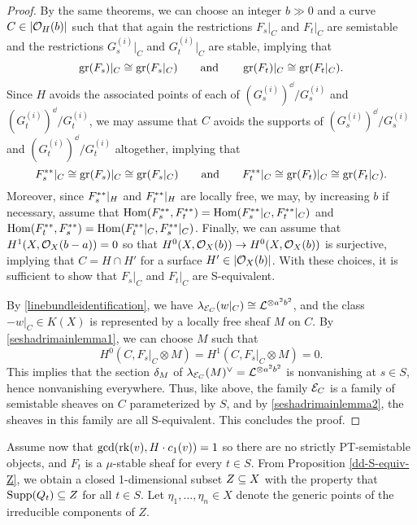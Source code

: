 \begin{proof}
By the same theorems, we can choose an integer $b \gg 0$ and a curve $C \in |\mathcal{O}_H(b)|$ such that that again the restrictions $F_s|_C$ and $F_t|_C$ are semistable and the restrictions $G_s^{(i)}|_C$ and $G_t^{(i)}|_C$ are stable, implying that 
\[ \operatorname{\mathrm{gr}}(F_s)|_C \cong \operatorname{\mathrm{gr}}(F_s|_C) \qquad \text{and} \qquad \operatorname{\mathrm{gr}}(F_t)|_C \cong \operatorname{\mathrm{gr}}(F_t|_C). \]
Since $H$ avoids the associated points of each of $(G_s^{(i)})^\dd/G_s^{(i)}$ and $(G_t^{(i)})^\dd/G_t^{(i)}$, we may assume that $C$ avoids the supports of $(G_s^{(i)})^\dd/G_s^{(i)}$ and $(G_t^{(i)})^\dd/G_t^{(i)}$ altogether, implying that
\[ F_s^{\ast\ast}|_C \cong \operatorname{\mathrm{gr}}(F_s)|_C \cong \operatorname{\mathrm{gr}}(F_s|_C) \qquad \text{and} \qquad F_t^{\ast\ast}|_C \cong \operatorname{\mathrm{gr}}(F_t)|_C \cong \operatorname{\mathrm{gr}}(F_t|_C). \]
Moreover, since $F_s^{\ast\ast}|_H$ and $F_t^{\ast\ast}|_H$ are locally free, we may, by increasing $b$ if necessary, assume that $\mathrm{Hom}(F_s^{\ast\ast}, F_t^{\ast\ast}) = \mathrm{Hom}(F_s^{\ast\ast}|_C, F_t^{\ast\ast}|_C)$ and $\mathrm{Hom}(F_t^{\ast\ast}, F_s^{\ast\ast}) = \mathrm{Hom}(F_t^{\ast\ast}|_C, F_s^{\ast\ast}|_C)$. Finally, we can assume that $H^1(X, \mathcal{O}_X(b-a)) = 0$ so that $H^0(X, \mathcal{O}_X(b)) \to H^0(X, \mathcal{O}_X(b))$ is surjective, implying that $C = H \cap H'$ for a surface $H' \in |\mathcal{O}_X(b)|$. With these choices, it is sufficient to show that $F_s|_C$ and $F_t|_C$ are S-equivalent. 

By \ref{linebundleidentification}, we have $\lambda_{\mathcal{E}_C}(w|_C) \cong \mathcal{L}^{\otimes a^2 b^2}$, and the class $-w|_C \in K(X)$ is represented by a locally free sheaf $M$ on $C$. By \ref{seshadrimainlemma1}, we can choose $M$ such that
\[ H^0(C, F_s|_C \otimes M) = H^1(C, F_s|_C \otimes M) = 0. \]
This implies that the section $\delta_M$ of $\lambda_{\mathcal{E}_C}(M)^\vee = \mathcal{L}^{\otimes a^2 b^2}$ is nonvanishing at $s \in S$, hence nonvanishing everywhere. Thus, like above, the family $\mathcal{E}_C$ is a family of semistable sheaves on $C$ parameterized by $S$, and by \ref{seshadrimainlemma2}, the sheaves in this family are all S-equivalent. This concludes the proof.

\end{proof}

Assume now that $\gcd(\operatorname{\mathrm{rk}}(v), H\cdot c_1(v)) = 1$ so there are no strictly PT-semistable objects, and $F_t$ is a $\mu$-stable sheaf for every $t \in S$. From Proposition \ref{dd-S-equiv-Z}, we obtain a closed 1-dimensional subset $Z \subseteq X$ with the property that $\operatorname{\mathrm{Supp}}(Q_t) \subseteq Z$ for all $t \in S$. Let $\eta_1,\ldots,\eta_n \in X$ denote the generic points of the irreducible components of $Z$. 

